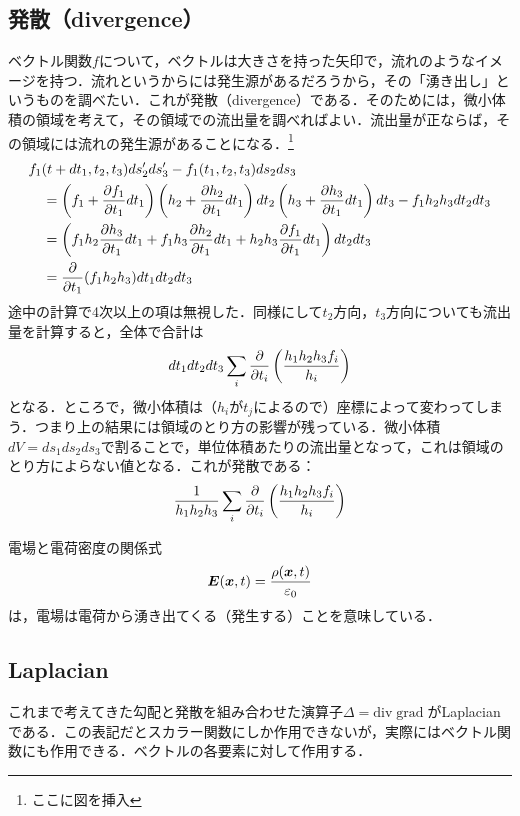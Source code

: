 \documentclass[a4paper,10pt,uplatex]{jsarticle}
\renewcommand{\div}{\mathrm{div}\;}
\renewcommand{\grad}{\mathrm{grad}\;}
\newcommand{\E}{\vb*{E}}
\newcommand{\x}{\vb*{x}}
\begin{document}
\subsection{発散（divergence）}
ベクトル関数$f$について，ベクトルは大きさを持った矢印で，流れのようなイメージを持つ．流れというからには発生源があるだろうから，その「湧き出し」というものを調べたい．これが発散（divergence）である．そのためには，微小体積の領域を考えて，その領域での流出量を調べればよい．流出量が正ならば，その領域には流れの発生源があることになる．\footnote{ここに図を挿入}
\begin{align}
    &f_1(t+dt_1, t_2, t_3) ds_2' ds_3' - f_1(t_1, t_2, t_3) ds_2 ds_3 \\
    &\quad = \left(f_1 + \pdv{f_1}{t_1}dt_1\right)\left(h_2+\pdv{h_2}{t_1}dt_1\right)dt_2\left(h_3+\pdv{h_3}{t_1}dt_1\right)dt_3 - f_1h_2h_3dt_2dt_3 \\
    &\quad = \left(f_1h_2\pdv{h_3}{t_1}dt_1 + f_1h_3\pdv{h_2}{t_1}dt_1 + h_2h_3\pdv{f_1}{t_1}dt_1\right)dt_2dt_3 \\
    &\quad = \pdv{t_1}(f_1h_2h_3)dt_1dt_2dt_3
\end{align}
途中の計算で4次以上の項は無視した．同様にして$t_2$方向，$t_3$方向についても流出量を計算すると，全体で合計は
\begin{equation}
    dt_1dt_2dt_3 \sum_i \pdv{t_i}\left(\frac{h_1h_2h_3f_i}{h_i}\right)
\end{equation}
となる．ところで，微小体積は（$h_i$が$t_j$によるので）座標によって変わってしまう．つまり上の結果には領域のとり方の影響が残っている．微小体積$dV = ds_1ds_2ds_3$で割ることで，単位体積あたりの流出量となって，これは領域のとり方によらない値となる．これが発散である：
\begin{equation}
    \frac{1}{h_1h_2h_3} \sum_i \pdv{t_i}\left(\frac{h_1h_2h_3f_i}{h_i}\right)
\end{equation}

電場と電荷密度の関係式
\begin{equation}
    \E(\x,t) = \frac{\rho(\x,t)}{\varepsilon_0}
\end{equation}
は，電場は電荷から湧き出てくる（発生する）ことを意味している．

\subsection{Laplacian}
これまで考えてきた勾配と発散を組み合わせた演算子$\Delta = \div \grad$がLaplacianである．この表記だとスカラー関数にしか作用できないが，実際にはベクトル関数にも作用できる．ベクトルの各要素に対して作用する．
\end{document}
